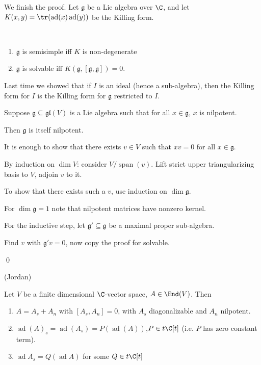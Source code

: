 \documentclass[x11names,reqno,14pt]{extarticle}
\newcommand{\mk}[1]{\mathfrak{#1}}
\newcommand{\g}{\mk{g}}
\DeclareMathOperator{\ad}{ad}
\newcommand{\gl}{\mk{g}\mk{l}}
\DeclareMathOperator{\Span}{span}
\begin{document}
We finish the proof. Let $\g$ be a Lie algebra over $\C$, and let $K(x,y) = \tr(\ad(x)\ad(y))$ be the Killing form.

\thm[Cartan]
\,
\begin{enumerate}[label=(\alph*)]

\item $\g$ is semisimple iff $K$ is non-degenerate

\item $\g$ is solvable iff $K(\g,[\g,\g]) = 0$.

\end{enumerate}

Last time we showed that if $I$ is an ideal (hence a sub-algebra), then the Killing form for $I$ is the Killing form for $\g$ restricted to $I$. 

\lem

Suppose $\g\subseteq\gl(V)$ is a Lie algebra such that for all $x \in \g$, $x$ is nilpotent. 

Then $\g$ is itself nilpotent. 

\proof[Sketch]

It is enough to show that there exists $v \in V$ such that $xv = 0$ for all $x \in \g$. 

By induction on $\dim V$: consider $V/\Span(v)$. Lift strict upper triangularizing basis to $V$, adjoin $v$ to it. 

To show that there exists such a $v$, use induction on $\dim \g$. 

For $\dim \g = 1$ note that nilpotent matrices have nonzero kernel. 

For the inductive step, let $\g' \subseteq \g$ be a maximal proper sub-algebra. 

Find $v$ with $\g'v = 0$, now copy the proof for solvable. 

\qed

\thm(Jordan)

Let $V$ be a finite dimensional $\C$-vector space, $A \in \End(V)$. Then
\begin{enumerate}

\item $A = A_s + A_n$ with $[A_s,A_n] = 0$, with $A_s$ diagonalizable and $A_n$ nilpotent.

\item $\ad(A)_s = \ad(A_s) = P(\ad(A))$,$P \in t\C[t]$ (i.e. $P$ has zero constant term). 

\item $\ad\bar{A_s} = Q(\ad A)$ for some $Q \in t\C[t]$

\end{enumerate}
\end{document}

